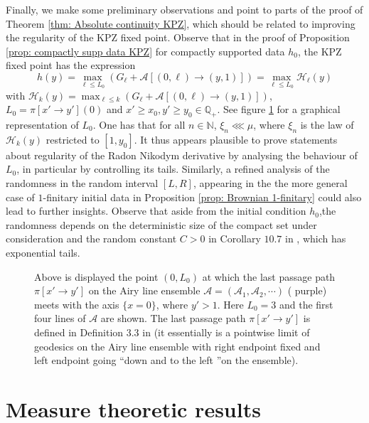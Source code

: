 \documentclass[12pt]{report}
\theoremstyle{plain}
\newcommand{\N}{\ensuremath{\mathbb{N}}}
\newcommand{\Q}{\ensuremath{\mathbb{Q}}}
\begin{document}
Finally, we make some preliminary observations and point to parts of the proof of Theorem \ref{thm: Absolute continuity KPZ}, which should be related to improving the regularity of the KPZ fixed point. Observe that in the proof of Proposition \ref{prop: compactly supp data KPZ} for compactly supported data $h_0$, the KPZ fixed point has the expression 
\[
h(y) = \max_{\ell\leq L_0}(G_{\ell}+\mathcal{A}[(0,\ell)\to (y,1)]) = \max_{\ell\leq L_0}\mathcal{H}_\ell(y)
\]
with $\mathcal{H}_k(y) = \displaystyle\max_{\ell\leq k}(G_{\ell}+\mathcal{A}[(0,\ell)\to (y,1)])$, $L_0 = \pi[x'\to y'](0)$ and $x'\geq x_0,y'\geq y_0\in\Q_+$. See figure \ref{fig: Airy geodesic} for a graphical representation of $L_0$. One has that for all $n\in\N$, $\xi_n\lll\mu$, where $\xi_n$ is the law of $\mathcal{H}_k(y)$ restricted to $[1,y_0]$. It thus appears plausible to prove statements about regularity of the Radon Nikodym derivative by analysing the behaviour of $L_0$, in particular by controlling its tails. Similarly, a refined analysis of the randomness in the random interval $[L,R]$, appearing in the the more general case of $1$-finitary initial data in Proposition \ref{prop: Brownian 1-finitary} could also lead to further insights. Observe that aside from the initial condition $h_0$,the randomness depends on the deterministic size of the compact set under consideration and the random constant $C>0$ in Corollary $10.7$ in \cite{DOV}, which has exponential tails. 

\begin{figure}[H]
\vspace{4cm}

\centering
\caption{Above is displayed the point $(0,L_0)$ at which the last passage path $\pi[x'\to y']$ on the Airy line ensemble $\mathcal{A} = (\mathcal{A}_1, \mathcal{A}_2,\cdots)$ (\color{purple} purple\color{black}) meets with the axis $\{x=0\}$, where $y'>1$. Here $L_0 = 3$ and the first four lines of $\mathcal{A}$ are shown. The last passage path $\pi[x'\to y']$ is defined in Definition 3.3 in \cite{sarkar2021brownian} (it essentially is a pointwise limit of geodesics on the Airy line ensemble with right endpoint fixed and left endpoint going \textquotedblleft down and to the left \textquotedblright on the ensemble).}
\label{fig: Airy geodesic}
\end{figure}

\appendix

\chapter{Measure theoretic results}
\end{document}

